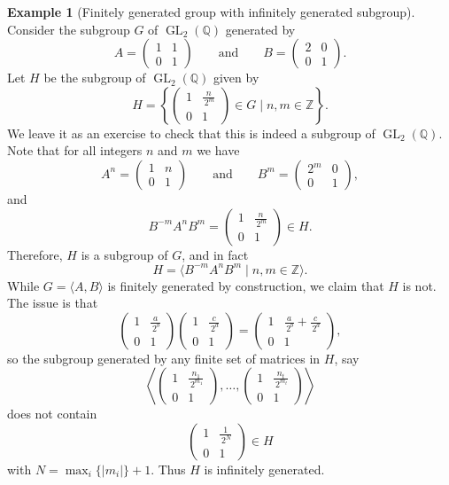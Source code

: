 \documentclass[12pt]{report}
\numberwithin{equation}{section}
\numberwithin{theorem}{chapter}
\theoremstyle{definition}
\newtheorem{example}[theorem]{Example}
\newtheorem*{basic properties}{Basic Properties}
\newtheorem*{Important Remark}{Important Remark}
\DeclareMathOperator{\GL}{GL}
\begin{document}
\begin{example}[Finitely generated group with infinitely generated subgroup]\label{fg group with infinitely generated subgroup}
	Consider the subgroup $G$ of $\GL_2(\mathbb{Q})$ generated by
	$$A = \begin{pmatrix}
		1 & 1 \\ 0 & 1
	\end{pmatrix} \qquad \textrm{and} \qquad B = \begin{pmatrix}
		2 & 0 \\ 0 & 1
	\end{pmatrix}.$$
	Let $H$ be the subgroup of $\GL_2(\mathbb{Q})$ given by
	$$H = \left\lbrace \begin{pmatrix} 1 & \frac{n}{\, 2^m} \\ 0 & 1 \end{pmatrix} \in G \displaystyle\mid n, m \in \mathbb{Z} \right\rbrace.$$
	We leave it as an exercise to check that this is indeed a subgroup of $\GL_2(\mathbb{Q})$. Note that for all integers $n$ and $m$ we have
	$$A^n = \begin{pmatrix} 1 & n \\ 0 & 1 \end{pmatrix} \qquad \textrm{and} \qquad B^m = \begin{pmatrix} 2^m & 0 \\ 0 & 1 \end{pmatrix},$$
	and
	$$B^{-m} A^n B^m = \begin{pmatrix} 1 & \frac{n}{\, 2^m} \\ 0 & 1 \end{pmatrix} \in H.$$
Therefore, $H$ is a subgroup of $G$, and in fact
$$H = \langle B^{-m} A^n B^m \mid n, m \in \mathbb{Z} \rangle.$$
While $G = \langle A, B \rangle$ is finitely generated by construction, we claim that $H$ is not. The issue is that
$$\begin{pmatrix} 1 & \frac{a}{\, 2^b} \\ 0 & 1 \end{pmatrix} 
\begin{pmatrix} 1 & \frac{c}{\, 2^d} \\ 0 & 1 \end{pmatrix} = 
\begin{pmatrix} 1 & \frac{a}{\, 2^b} + \frac{c}{\, 2^d} \\ 0 & 1 \end{pmatrix},$$
so the subgroup generated by any finite set of matrices in $H$, say
$$\left\langle \begin{pmatrix} 1 & \frac{n_1}{\, 2^{m_1}} \\ 0 & 1 \end{pmatrix}, \ldots, \begin{pmatrix} 1 & \frac{n_t}{\, 2^{m_t}} \\ 0 & 1 \end{pmatrix} \right\rangle$$
does not contain
$$\begin{pmatrix} 1 & \frac{1}{\, 2^{N}} \\ 0 & 1 \end{pmatrix} \in H$$
with $N = \max_i \{|m_i| \} + 1$. Thus $H$ is infinitely generated.
\end{example}
\end{document}
